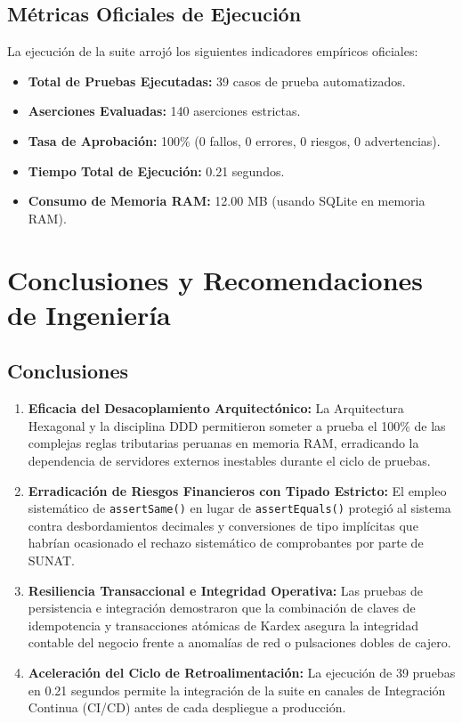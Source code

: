 \documentclass[11pt,a4paper]{article}
\begin{document}
\subsection{Métricas Oficiales de Ejecución}
La ejecución de la suite arrojó los siguientes indicadores empíricos oficiales:
\begin{itemize}[noitemsep]
    \item \textbf{Total de Pruebas Ejecutadas:} 39 casos de prueba automatizados.
    \item \textbf{Aserciones Evaluadas:} 140 aserciones estrictas.
    \item \textbf{Tasa de Aprobación:} 100\% (0 fallos, 0 errores, 0 riesgos, 0 advertencias).
    \item \textbf{Tiempo Total de Ejecución:} 0.21 segundos.
    \item \textbf{Consumo de Memoria RAM:} 12.00 MB (usando SQLite en memoria RAM).
\end{itemize}

\section{Conclusiones y Recomendaciones de Ingeniería}

\subsection{Conclusiones}
\begin{enumerate}[noitemsep]
    \item \textbf{Eficacia del Desacoplamiento Arquitectónico:} La Arquitectura Hexagonal y la disciplina DDD permitieron someter a prueba el 100\% de las complejas reglas tributarias peruanas en memoria RAM, erradicando la dependencia de servidores externos inestables durante el ciclo de pruebas.
    \item \textbf{Erradicación de Riesgos Financieros con Tipado Estricto:} El empleo sistemático de \texttt{assertSame()} en lugar de \texttt{assertEquals()} protegió al sistema contra desbordamientos decimales y conversiones de tipo implícitas que habrían ocasionado el rechazo sistemático de comprobantes por parte de SUNAT.
    \item \textbf{Resiliencia Transaccional e Integridad Operativa:} Las pruebas de persistencia e integración demostraron que la combinación de claves de idempotencia y transacciones atómicas de Kardex asegura la integridad contable del negocio frente a anomalías de red o pulsaciones dobles de cajero.
    \item \textbf{Aceleración del Ciclo de Retroalimentación:} La ejecución de 39 pruebas en 0.21 segundos permite la integración de la suite en canales de Integración Continua (CI/CD) antes de cada despliegue a producción.
\end{enumerate}
\end{document}
